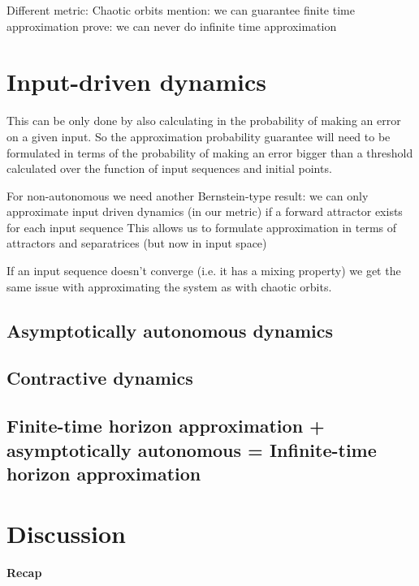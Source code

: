 \documentclass{article}
\theoremstyle{definition}
\theoremstyle{remark}
\newcounter{ct}
\begin{document}
Different metric: Chaotic orbits
mention: we can guarantee finite time approximation
prove: we can never do infinite time approximation 



\section{Input-driven dynamics}

This can be only done by also calculating in the probability of making an error on a given input.
So the approximation probability guarantee will need to be formulated in terms of the probability of making an error bigger than a threshold calculated over the function of input sequences and initial points.

For non-autonomous we need another Bernstein-type result:
we can only approximate input driven dynamics (in our metric) if a forward attractor exists for each input sequence 
This allows us to formulate approximation in terms of attractors and separatrices (but now in input space)

If an input sequence doesn't converge (i.e. it has a mixing property) we get the same issue with approximating the system as with chaotic orbits.



\subsection{Asymptotically autonomous dynamics}


\subsection{Contractive dynamics}


\subsection{Finite-time horizon approximation + asymptotically autonomous = Infinite-time horizon approximation}









\section{Discussion}
\paragraph{Recap}	
\end{document}
